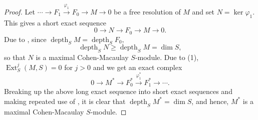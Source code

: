 \documentclass[10pt]{article}
\theoremstyle{thmstyle}
\theoremstyle{defstyle}
\renewcommand{\ge}{\geqslant}
\newcommand{\Ext}{\operatorname{Ext}}
\newcommand{\depth}{\operatorname{depth}}
\begin{document}
\begin{proof}
    Let $\cdots\to F_1\xrightarrow{\varphi_1} F_0\to M\to 0$ be a free resolution of $M$ and set $N = \ker\varphi_1$. This gives a short exact sequence 
    \begin{equation*}
        0\to N\to F_0\to M\to 0.
    \end{equation*}
    Due to , since $\depth_S M = \depth_S F_0$,
    \begin{equation*}
        \depth_S N\ge\depth_S M = \dim S,
    \end{equation*}
    so that $N$ is a maximal Cohen-Macaulay $S$-module. Due to (1),  $\Ext^j_S(M, S) = 0$ for $j > 0$ and we get an exact complex 
    \begin{equation*}
        0\to M^\ast\to F_0^\ast\xrightarrow{\varphi_1^\ast} F_1^\ast\to\cdots.
    \end{equation*}
    Breaking up the above long exact sequence into short exact sequences and making repeated use of , it is clear that $\depth_S M^\ast = \dim S$, and hence, $M^\ast$ is a maximal Cohen-Macaulay $S$-module.
\end{proof}
\end{document}
